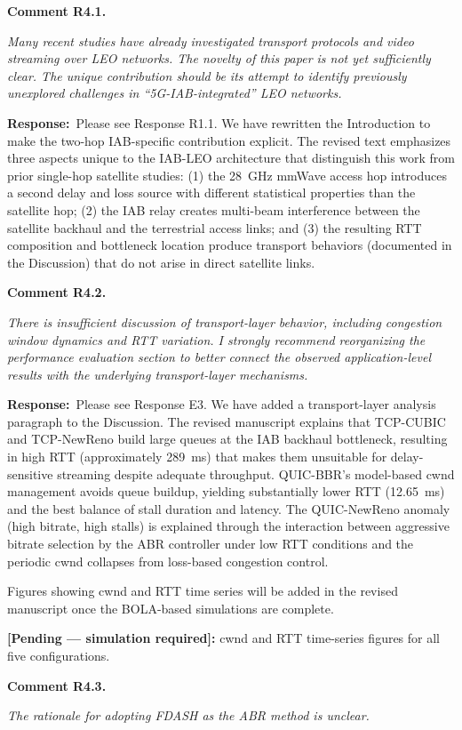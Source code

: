 \documentclass[11pt]{article}
\newcommand{\comment}[2]{\vspace{0.8em}\noindent\textbf{Comment #1.}\begin{reviewbox}\textit{#2}\end{reviewbox}}
\newcommand{\response}{\noindent\textbf{Response:}~}
\newcommand{\pending}[1]{\textcolor{red!70!black}{\textbf{[Pending — simulation required]:} #1}}
\begin{document}
\comment{R4.1}{Many recent studies have already investigated transport protocols and video streaming over LEO networks. The novelty of this paper is not yet sufficiently clear. The unique contribution should be its attempt to identify previously unexplored challenges in ``5G-IAB-integrated'' LEO networks.}

\response Please see Response R1.1. We have rewritten the Introduction to make the two-hop IAB-specific contribution explicit. The revised text emphasizes three aspects unique to the IAB-LEO architecture that distinguish this work from prior single-hop satellite studies: (1) the 28~GHz mmWave access hop introduces a second delay and loss source with different statistical properties than the satellite hop; (2) the IAB relay creates multi-beam interference between the satellite backhaul and the terrestrial access links; and (3) the resulting RTT composition and bottleneck location produce transport behaviors (documented in the Discussion) that do not arise in direct satellite links.

\comment{R4.2}{There is insufficient discussion of transport-layer behavior, including congestion window dynamics and RTT variation. I strongly recommend reorganizing the performance evaluation section to better connect the observed application-level results with the underlying transport-layer mechanisms.}

\response Please see Response E3. We have added a transport-layer analysis paragraph to the Discussion. The revised manuscript explains that TCP-CUBIC and TCP-NewReno build large queues at the IAB backhaul bottleneck, resulting in high RTT (approximately 289~ms) that makes them unsuitable for delay-sensitive streaming despite adequate throughput. QUIC-BBR's model-based cwnd management avoids queue buildup, yielding substantially lower RTT (12.65~ms) and the best balance of stall duration and latency. The QUIC-NewReno anomaly (high bitrate, high stalls) is explained through the interaction between aggressive bitrate selection by the ABR controller under low RTT conditions and the periodic cwnd collapses from loss-based congestion control.

Figures showing cwnd and RTT time series will be added in the revised manuscript once the BOLA-based simulations are complete.

\pending{cwnd and RTT time-series figures for all five configurations.}

\comment{R4.3}{The rationale for adopting FDASH as the ABR method is unclear.}
\end{document}
